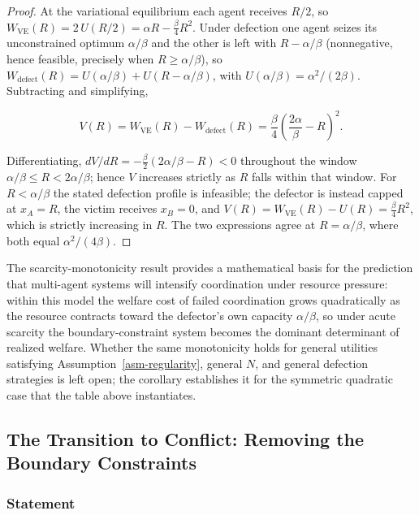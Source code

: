 \documentclass[11pt]{article}
\theoremstyle{plain}
\theoremstyle{definition}
\theoremstyle{remark}
\let\origsubsection\subsection
\renewcommand{\subsection}{\needspace{7\baselineskip}\origsubsection}
\let\origsubsubsection\subsubsection
\renewcommand{\subsubsection}{\needspace{4\baselineskip}\origsubsubsection}
\begin{document}
\begin{proof}
At the variational equilibrium each agent receives $R/2$, so $W_{\text{VE}}(R) = 2\,U(R/2) = \alpha R - \tfrac{\beta}{4} R^2$. Under defection one agent seizes its unconstrained optimum $\alpha/\beta$ and the other is left with $R - \alpha/\beta$ (nonnegative, hence feasible, precisely when $R \geq \alpha/\beta$), so $W_{\text{defect}}(R) = U(\alpha/\beta) + U(R - \alpha/\beta)$, with $U(\alpha/\beta) = \alpha^2/(2\beta)$. Subtracting and simplifying,

$$V(R) = W_{\text{VE}}(R) - W_{\text{defect}}(R) = \frac{\beta}{4}\left(\frac{2\alpha}{\beta} - R\right)^2.$$

Differentiating, $dV/dR = -\tfrac{\beta}{2}\left(2\alpha/\beta - R\right) < 0$ throughout the window $\alpha/\beta \leq R < 2\alpha/\beta$; hence $V$ increases strictly as $R$ falls within that window. For $R < \alpha/\beta$ the stated defection profile is infeasible; the defector is instead capped at $x_A = R$, the victim receives $x_B = 0$, and $V(R) = W_{\text{VE}}(R) - U(R) = \frac{\beta}{4} R^2$, which is strictly increasing in $R$. The two expressions agree at $R = \alpha/\beta$, where both equal $\alpha^2/(4\beta)$.
\end{proof}

The scarcity-monotonicity result provides a mathematical basis for the
prediction that multi-agent systems will intensify coordination under
resource pressure: within this model the welfare cost of failed
coordination grows quadratically as the resource contracts toward the
defector's own capacity \(\alpha/\beta\), so under acute scarcity the
boundary-constraint system becomes the dominant determinant of realized
welfare. Whether the same monotonicity holds for general utilities
satisfying Assumption~\ref{asm-regularity}, general \(N\), and general
defection strategies is left open; the corollary establishes it for the
symmetric quadratic case that the table above instantiates.

\subsection{The Transition to Conflict: Removing the Boundary
Constraints}\label{the-transition-to-conflict-removing-the-boundary-constraints}

\subsubsection{Statement}\label{statement}
\end{document}
